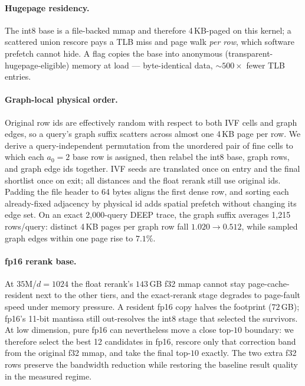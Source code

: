 \documentclass{article}
\begin{document}
\paragraph{Hugepage residency.} The int8 base is a file-backed mmap and therefore
4\,KB-paged on this kernel; a scattered union rescore pays a TLB miss and page walk
\emph{per row}, which software prefetch cannot hide. A flag copies the base into
anonymous (transparent-hugepage-eligible) memory at load --- byte-identical data,
${\sim}500\times$ fewer TLB entries.

\paragraph{Graph-local physical order.} Original row ids are effectively random
with respect to both IVF cells and graph edges, so a query's graph suffix scatters
across almost one 4\,KB page per row. We derive a query-independent permutation
from the unordered pair of fine cells to which each $a_0{=}2$ base row is assigned,
then relabel the int8 base, graph rows, and graph edge ids together. IVF seeds are
translated once on entry and the final shortlist once on exit; all distances and
the float rerank still use original ids. Padding the file header to 64 bytes aligns
the first dense row, and sorting each already-fixed adjacency by physical id adds
spatial prefetch without changing its edge set. On an exact 2,000-query DEEP trace,
the graph suffix averages 1,215 rows/query: distinct 4\,KB pages per graph row fall
$1.020\to0.512$, while sampled graph edges within one page rise to $7.1\%$.

\paragraph{fp16 rerank base.} At $35$M/$d{=}1024$ the float rerank's $143$\,GB f32
mmap cannot stay page-cache-resident next to the other tiers, and the exact-rerank
stage degrades to page-fault speed under memory pressure. A resident fp16 copy
halves the footprint ($72$\,GB); fp16's 11-bit mantissa still out-resolves the int8
stage that selected the survivors. At low dimension, pure fp16 can nevertheless
move a close top-$10$ boundary: we therefore select the best 12 candidates in fp16,
rescore only that correction band from the original f32 mmap, and take the final
top-$10$ exactly. The two extra f32 rows preserve the bandwidth reduction while
restoring the baseline result quality in the measured regime.
\end{document}
